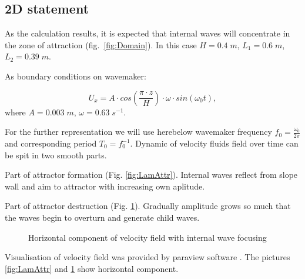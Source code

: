 \documentclass[a4wide,fontsize=12pt]{article}
\begin{document}
\subsection{2D statement}

As the calculation results, it is expected that internal waves will concentrate in the zone of attraction (fig.~\ref{fig:Domain}). In this case $H = 0.4 \; m$, $L_1=0.6 \; m$, $L_2 = 0.39 \; m$.

As boundary conditions on wavemaker:

\begin{equation}
    U_x = A\cdot cos\left(\frac{\pi \cdot z}{H}\right)\cdot \omega \cdot  sin(\omega_0 t),
    \label{eq:wmc}
\end{equation}
where $A = 0.003 \; m$, $\omega = 0.63 \; s^{-1}$.

For the further representation we will use herebelow wavemaker frequency $f_0=\tfrac{\omega_0}{2\pi}$ and corresponding period $T_0=f_0^{-1}$. 
Dynamic of velocity fluids field over time can be spit in two smooth parts.

Part of attractor formation (Fig. \ref{fig:LamAttr}). Internal waves reflect from slope wall and aim to attractor with increasing own aplitude.

Part of attractor destruction (Fig. \ref{fig:turbAttr}). Gradually amplitude grows so much that the waves begin to overturn and generate child waves.

\begin{figure}
\centering
    \begin{minipage}[t]{0.45\textwidth}
        \centering
        \label{fig:LamAttr}
    \end{minipage}
    \begin{minipage}[t]{0.45\textwidth}
        \centering
        \label{fig:turbAttr}
    \end{minipage}
    \caption{Horizontal component of velocity field with internal wave focusing}
\end{figure}


Visualisation of velocity field was provided by paraview software \cite{paraview}. The pictures \ref{fig:LamAttr} and \ref{fig:turbAttr} show horizontal component.
\end{document}
